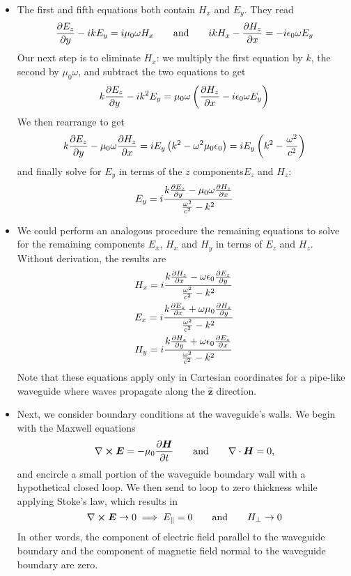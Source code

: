 \documentclass[11pt, a4paper]{article}
\newcommand{\eqtext}[1]{\qquad \text{#1} \qquad}
\renewcommand{\vec}[1]{\bm{#1}} %
\newcommand{\uvec}[1]{\hat{\vec{#1}}} %
\newcommand{\E}{\vec{E}}  %
\renewcommand{\H}{\vec{H}}  %
\newcommand{\ee}{\epsilon_{0}}  %
\newcommand{\mm}{\mu_{0}}  %
\newcommand{\m}{\vec{m}}  %
\renewcommand{\div}{\nabla \cdot}
\renewcommand{\curl}{\nabla \cross}
\begin{document}
\begin{itemize}
	\item The first and fifth equations both contain $ H_{x} $ and $ E_{y} $. They read
	\begin{equation*}
		\pdv{E_{z}}{y} - ikE_{y} = i \mm \omega H_{x} \eqtext{and} ikH_{x}  - \pdv{H_{z}}{x}   = -i\ee \omega E_{y}
	\end{equation*}
	Our next step is to eliminate $ H_{x} $: we multiply the first equation by $ k $, the second by $ \mm \omega $, and subtract the two equations to get
	\begin{equation*}
		k \pdv{E_{z}}{y} - i k^{2}E_{y}= \mm \omega \left(\pdv{H_{z}}{x} - i \ee \omega E_{y}\right)
	\end{equation*}
	We then rearrange to get
	\begin{equation*}
		k \pdv{E_{z}}{y} - \mm \omega \pdv{H_{z}}{x} = iE_{y}\left(k^{2} - \omega^{2}\mm \ee\right) =  iE_{y}\left(k^{2} - \frac{\omega^{2}}{c^{2}}\right) 
	\end{equation*}
	and finally solve for $ E_{y} $ in terms of the $ z $ components$ E_{z} $ and $ H_{z} $:
	\begin{equation*}
		E_{y} = i \frac{k \pdv{E_{z}}{y} - \mm \omega \pdv{H_{z}}{x}}{\frac{\omega^{2}}{c^{2}} - k^{2}}
	\end{equation*}
	
	\item We could perform an analogous procedure the remaining equations to solve for the remaining components $ E_{x} $, $ H_{x} $ and $ H_{y} $ in terms of $ E_{z} $ and $ H_{z} $. Without derivation, the results are
	\begin{align*}
		&H_{x} = i \frac{k\pdv{H_{z}}{x} - \omega \ee \pdv{E_{z}}{y}}{\frac{\omega^{2}}{c^{2}} - k^{2}}\\
		&E_{x} = i \frac{k \pdv{E_{z}}{x} + \omega \mm \pdv{H_{z}}{y}}{\frac{\omega^{2}}{c^{2}} - k^{2}}\\
		&H_{y} = i \frac{k\pdv{H_{z}}{y} + \omega \ee \pdv{E_{z}}{x}}{\frac{\omega^{2}}{c^{2}} - k^{2}}\\
	\end{align*}
	Note that these equations apply only in Cartesian coordinates for a pipe-like waveguide where waves propagate along the $ \uvec{z} $ direction.
	
	
	\item Next, we consider boundary conditions at the waveguide's walls. We begin with the Maxwell equations
	\begin{equation*}
		\curl \E = - \mm \pdv{\H}{t} \eqtext{and} \div \H = 0,
	\end{equation*}
	and encircle a small portion of the waveguide boundary wall with a hypothetical closed loop. We then send to loop to zero thickness while applying Stoke's law, which results in 
	\begin{equation*}
		\curl \E \to 0 \implies E_{\parallel} = 0 \eqtext{and} H_{\perp} \to 0
	\end{equation*}
	In other words, the component of electric field parallel to the waveguide boundary and the component of magnetic field normal to the waveguide boundary are zero.
	

\end{itemize}
\end{document}
